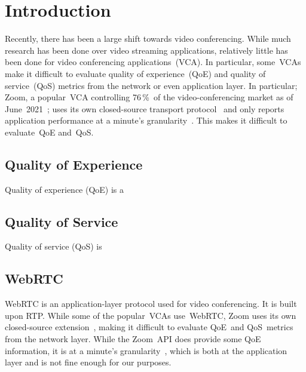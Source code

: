 \section{Introduction}\label{introduction}
    Recently, there has been a large shift towards video conferencing. While much research has been done over video streaming applications, relatively little has been done for video conferencing applications~(VCA). In particular, some~VCAs make it difficult to evaluate quality of experience~(QoE) and quality of service~(QoS) metrics from the network or even application layer. In particular; Zoom, a popular~VCA controlling 76\,\%~of the video-conferencing market as of June~2021~\autocite{kim2021}; uses its own closed-source transport protocol~\autocite{marczak2020} and only reports application performance at a minute's granularity~\autocite{walia2019}. This makes it difficult to evaluate~QoE and~QoS.

    \subsection{Quality of Experience}\label{introduction:qoe}
        Quality of experience (QoE) is a

    \subsection{Quality of Service}\label{introduction:qos}
        Quality of service (QoS) is 

    \subsection{WebRTC}\label{introduction:webrtc}
        WebRTC is an application-layer protocol used for video conferencing. It is built upon RTP. While some of the popular~VCAs use~WebRTC, Zoom uses its own closed-source extension~\autocite{marczak2020}, making it difficult to evaluate QoE~and QoS~metrics from the network layer. While the Zoom~API does provide some QoE information, it is at a minute's granularity~\autocite{walia2019}, which is both at the application layer and is not fine enough for our purposes.
